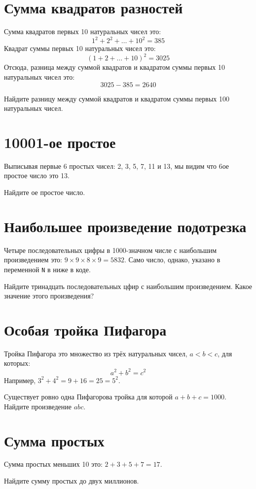 \documentclass[11pt,a4paper]{article}
\newcommand{\pycode}[1]{}
\newenvironment{task}[2]
{\section{#1}
\newcommand{\printcode}{\pycode{#2}}
}
{\printcode
}
\begin{document}
\begin{task}{Сумма квадратов разностей}{006-sum-square-difference.py}
    Сумма квадратов первых 10 натуральных чисел это:
    \begin{equation*}
        1^2 + 2^2 + \dots + 10^2 = 385
    \end{equation*}
    Квадрат суммы первых 10 натуральных чисел это:
    \begin{equation*}
        \left(1 + 2 + \dots + 10\right)^2 = 3025
    \end{equation*}
    Отсюда, разница между суммой квадратов и квадратом суммы первых 10 натуральных чисел это:
    \begin{equation*}
        3025 - 385 = 2640
    \end{equation*}

    Найдите разницу между суммой квадратов и квадратом суммы первых 100 натуральных чисел.
\end{task}

\begin{task}{10001-ое простое}{007-10001st-prime.py}
    Выписывая первые 6 простых чисел: 2, 3, 5, 7, 11 и 13, мы видим что 6ое простое число это 13.

    Найдите ое простое число.
\end{task}

\begin{task}{Наибольшее произведение подотрезка}{008-largest-product-in-a-series.py}
    Четыре последовательных цифры в 1000-значном числе с наибольшим произведением это: $9\times 9 \times 8 \times 9 = 5832$.
    Само число, однако, указано в переменной \texttt{N} в ниже в коде.

    Найдите тринадцать последовательных цфир с наибольшим произведением.
    Какое значение этого произведения?
\end{task}

\begin{task}{Особая тройка Пифагора}{009-special-pythagorean-triplet.py}
    Тройка Пифагора это множество из трёх натуральных чисел, $a < b < c$, для которых:
    \begin{equation*}
        a^2+b^2 = c^2
    \end{equation*}
    Например, $3^2+4^2=9+16=25=5^2$.

    Существует ровно одна Пифагорова тройка для которой $a+b+c=1000$.
    Найдите произведение $abc$.
\end{task}

\begin{task}{Сумма простых}{010-summation-of-primes.py}
    Сумма простых меньших 10 это: $2+3+5+7=17$.

    Найдите сумму простых до двух миллионов.
\end{task}
\end{document}
